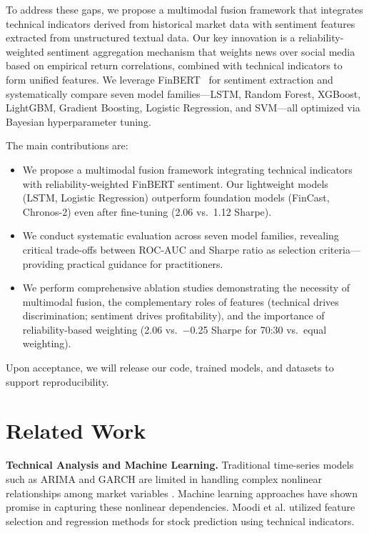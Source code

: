 \documentclass[a4paper,10pt,conference]{IEEEtran}
\begin{document}
To address these gaps, we propose a multimodal fusion framework that integrates technical indicators derived from historical market data with sentiment features extracted from unstructured textual data.
Our key innovation is a reliability-weighted sentiment aggregation mechanism that weights news over social media based on empirical return correlations, combined with technical indicators to form unified features. We leverage FinBERT~\cite{araci_2019} for sentiment extraction and systematically compare seven model families---LSTM, Random Forest, XGBoost, LightGBM, Gradient Boosting, Logistic Regression, and SVM---all optimized via Bayesian hyperparameter tuning.

The main contributions are:
\begin{itemize}
    \item We propose a multimodal fusion framework integrating technical indicators with reliability-weighted FinBERT sentiment. Our lightweight models (LSTM, Logistic Regression) outperform foundation models (FinCast, Chronos-2) even after fine-tuning (2.06 vs.\ 1.12 Sharpe).
    
    \item We conduct systematic evaluation across seven model families, revealing critical trade-offs between ROC-AUC and Sharpe ratio as selection criteria---providing practical guidance for practitioners.
    
    \item We perform comprehensive ablation studies demonstrating the necessity of multimodal fusion, the complementary roles of features (technical drives discrimination; sentiment drives profitability), and the importance of reliability-based weighting (2.06 vs.\ $-$0.25 Sharpe for 70:30 vs.\ equal weighting).
\end{itemize}

\noindent Upon acceptance, we will release our code, trained models, and datasets to support reproducibility.

\section{Related Work}

\noindent\textbf{Technical Analysis and Machine Learning.}
Traditional time-series models such as ARIMA and GARCH are limited in handling complex nonlinear relationships among market variables \cite{bowden2008short}. Machine learning approaches have shown promise in capturing these nonlinear dependencies. Moodi et al. \cite{moodi2023} utilized feature selection and regression methods for stock prediction using technical indicators.
\end{document}
